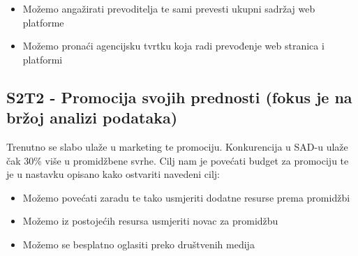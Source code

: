 \documentclass[a4paper]{article}
\begin{document}
	\begin{itemize}
		\item Možemo angažirati prevoditelja te sami prevesti ukupni sadržaj web platforme
		\item Možemo pronaći agencijsku tvrtku koja radi prevođenje web stranica i platformi
	\end{itemize}

	\subsection{S2T2 - Promocija svojih prednosti (fokus je na bržoj analizi podataka)}
	Trenutno se slabo ulaže u marketing te promociju. Konkurencija u SAD-u ulaže čak 30\% više u promidžbene svrhe. Cilj nam je povećati budget za promociju te je u nastavku opisano kako ostvariti navedeni cilj:

	\begin{itemize}
		\item Možemo povećati zaradu te tako usmjeriti dodatne resurse prema promidžbi
		\item Možemo iz postojećih resursa usmjeriti novac  za promidžbu
		\item Možemo se besplatno oglasiti preko društvenih medija
	\end{itemize}


\clearpage


	
	
\end{document}
